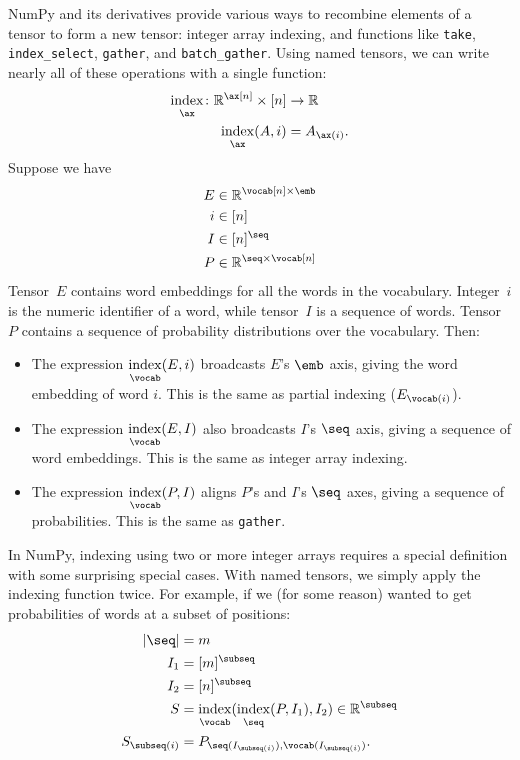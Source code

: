 \documentclass{article}
\newcommand{\reals}{\mathbb{R}}
\begin{document}
NumPy and its derivatives provide various ways to recombine elements of a tensor to form a new tensor: integer array indexing, and functions like \verb|take|, \verb|index_select|, \verb|gather|, and \verb|batch_gather|. Using named tensors, we can write nearly all of these operations with a single function:
\begin{align*}
  \nfun{\ax}{index} \colon \reals^{\ax[n]} \times [n] &\rightarrow \reals \\
  \nfun{\ax}{index}(A, i) &= A_{\ax(i)}.
\end{align*}
Suppose we have
\begin{align*}
  E &\in \reals^{\vocab[n] \times \emb} \\
  i &\in [n] \\
  I &\in [n]^{\seq} \\
  P &\in \reals^{\seq \times \vocab[n]}
\end{align*}
Tensor~$E$ contains word embeddings for all the words in the vocabulary. Integer~$i$ is the numeric identifier of a word, while tensor~$I$ is a sequence of words. Tensor~$P$ contains a sequence of probability distributions over the vocabulary. Then:
\begin{itemize}
\item The expression $\nfun{\vocab}{index}(E,i)$ broadcasts $E$'s $\emb$ axis, giving the word embedding of word $i$. This is the same as partial indexing ($E_{\vocab(i)}$).
\item The expression $\nfun{\vocab}{index}(E,I)$ also broadcasts $I$'s $\seq$ axis, giving a sequence of word embeddings. This is the same as integer array indexing.
\item The expression $\nfun{\vocab}{index}(P,I)$ aligns $P$'s and $I$'s $\seq$ axes, giving a sequence of probabilities. This is the same as \verb|gather|.
\end{itemize}

In NumPy, indexing using two or more integer arrays requires a special definition with some surprising special cases. With named tensors, we simply apply the indexing function twice. For example, if we (for some reason) wanted to get probabilities of words at a subset of positions:
\begin{align*}
  |\seq| &= m \\
  I_1 &= [m]^\subseq \\
  I_2 &= [n]^\subseq \\
  S &= \nfun{\vocab}{index}(\nfun{\seq}{index}(P, I_1), I_2) \in \reals^{\subseq} \\
  S_{\subseq(i)} &= P_{\seq(I_{\subseq(i)}), \vocab(I_{\subseq(i)})}.
\end{align*}
\end{document}
